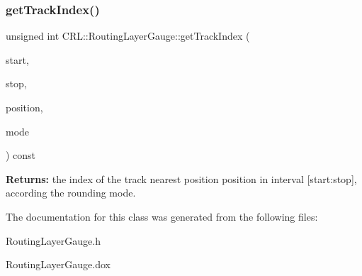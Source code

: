 \subsubsection{\texorpdfstring{get\+Track\+Index()}{getTrackIndex()}}
{\footnotesize\ttfamily unsigned int C\+R\+L\+::\+Routing\+Layer\+Gauge\+::get\+Track\+Index (\begin{DoxyParamCaption}\item[{\textbf{ Db\+U\+::\+Unit}}]{start,  }\item[{\textbf{ Db\+U\+::\+Unit}}]{stop,  }\item[{\textbf{ Db\+U\+::\+Unit}}]{position,  }\item[{unsigned}]{mode }\end{DoxyParamCaption}) const}

{\bfseries Returns\+:} the index of the track nearest position {\ttfamily position} in interval {\ttfamily \mbox{[}start\+:stop\mbox{]}}, according the rounding {\ttfamily mode}. 

The documentation for this class was generated from the following files\+:\begin{DoxyCompactItemize}
\item 
Routing\+Layer\+Gauge.\+h\item 
Routing\+Layer\+Gauge.\+dox\end{DoxyCompactItemize}
